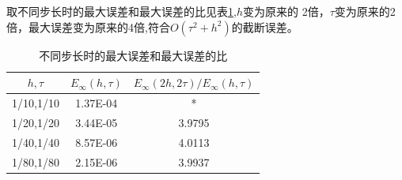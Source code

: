 \documentclass[withoutpreface,bwprint]{cumcmthesis} %
\begin{document}
	取不同步长时的最大误差和最大误差的比见表\ref{tab:2},$h$变为原来的
	2倍，$\tau$变为原来的2倍，最大误差变为原来的4倍,符合$O(\tau^2+h^2)$的截断误差。
	\begin{table}[htbp]
		\centering
		\caption{不同步长时的最大误差和最大误差的比}
		\begin{tabular}{ccc}
			\toprule[1.5pt]
			$h,\tau$   & $E_{\infty}(h,\tau)$ & $E_{\infty}(2h,2\tau)/E_{\infty}(h,\tau)$ \\
			\midrule[1pt]
			1/10,1/10 & 1.37E-04 & * \\
			1/20,1/20 & 3.44E-05 & 3.9795  \\
			1/40,1/40 & 8.57E-06 & 4.0113  \\
			1/80,1/80 & 2.15E-06 & 3.9937  \\
			\bottomrule[1.5pt]
		\end{tabular}%
		\label{tab:2}%
	\end{table}%
	
\end{document}
